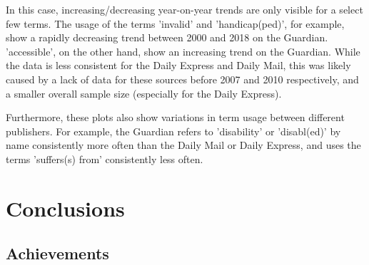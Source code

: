 \documentclass{report}
\begin{document}
In this case, increasing/decreasing year-on-year trends are only visible for a select few terms.
The usage of the terms 'invalid' and 'handicap(ped)', for example, show a rapidly decreasing trend between 2000 and 2018 on the Guardian.
'accessible', on the other hand, show an increasing trend on the Guardian.
While the data is less consistent for the Daily Express and Daily Mail, this was likely caused by a lack of data for these sources before 2007 and 2010 respectively, and a smaller overall sample size (especially for the Daily Express).

Furthermore, these plots also show variations in term usage between different publishers.
For example, the Guardian refers to 'disability' or 'disabl(ed)' by name consistently more often than the Daily Mail or Daily Express, and uses the terms 'suffers(s) from' consistently less often.






\chapter{Conclusions} \label{Conclusions}  %


\section{Achievements} \label{Achievements}
\end{document}
